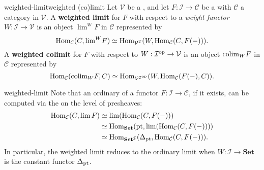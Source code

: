 \begin{topic}{weighted-limit}{weighted (co)limit}
    Let $\mathcal{V}$ be a , and let $F : \mathcal{I} \to \mathcal{C}$ be a  with $\mathcal{C}$ a category  in $\mathcal{V}$. A \textbf{weighted limit} for $F$ with respect to a \textit{weight functor} $W : \mathcal{I} \to \mathcal{V}$ is an object ${\lim}^W F$ in $\mathcal{C}$ represented by
    \[ \text{Hom}_\mathcal{C}(C, {\lim}^W F) \simeq \text{Hom}_{\mathcal{V}^\mathcal{I}}(W, \text{Hom}_\mathcal{C}(C, F(-))) . \]
    A \textbf{weighted colimit} for $F$ with respect to $W : \mathcal{I}^\textup{op} \to \mathcal{V}$ is an object ${\operatorname*{colim}}_W F$ in $\mathcal{C}$ represented by
    \[ \text{Hom}_\mathcal{C}({\operatorname*{colim}}_W F, C) \simeq \text{Hom}_{\mathcal{V}^{\mathcal{I}^\textup{op}}}(W, \text{Hom}_\mathcal{C}(F(-), C)) . \]
\end{topic}

\begin{example}{weighted-limit}
    Note that an ordinary  of a functor $F : \mathcal{I} \to \mathcal{C}$, if it exists, can be computed via the  on the level of presheaves:
    \[ \begin{aligned} \text{Hom}_\mathcal{C}(C, \lim F) &\simeq \lim (\text{Hom}_\mathcal{C}(C, F(-))) \\ &\simeq \text{Hom}_\textbf{Set}(\textup{pt}, \lim (\text{Hom}_\mathcal{C}(C, F(-)))) \\ &\simeq \text{Hom}_{\textbf{Set}^\mathcal{I}}(\Delta_{\textup{pt}}, \text{Hom}_\mathcal{C}(C, F(-))) . \end{aligned} \]
    In particular, the weighted limit reduces to the ordinary limit when $W : \mathcal{I} \to \textbf{Set}$ is the constant functor $\Delta_\textup{pt}$.
\end{example}

